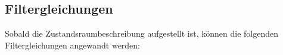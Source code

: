%

\subsection{Filtergleichungen}
Sobald die Zustandsraumbeschreibung aufgestellt ist, können die folgenden Filtergleichungen angewandt werden:

